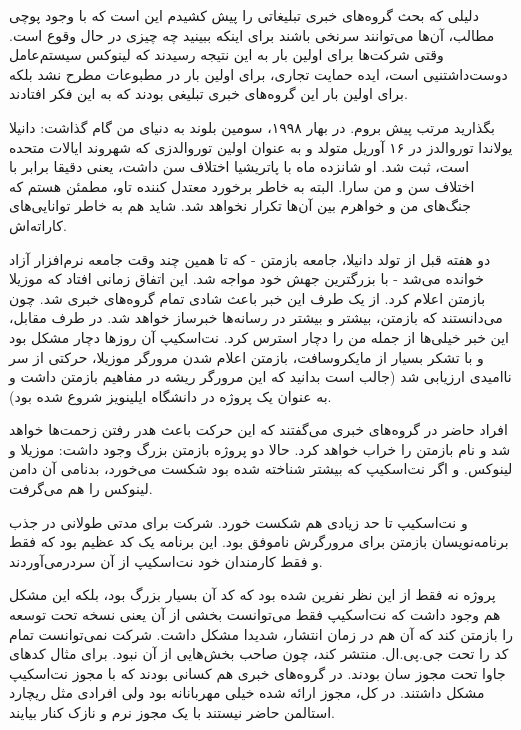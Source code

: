 دلیلی که بحث گروه‌های خبری تبلیغاتی را پیش کشیدم این است که با وجود
پوچی مطالب، آن‌ها می‌توانند سرنخی باشند برای اینکه ببینید چه چیزی در حال
وقوع است. وقتی شرکت‌ها برای اولین بار به این نتیجه رسیدند که لینوکس
سیستم‌عامل دوست‌داشتنیی است، ایده حمایت تجاری، برای اولین بار در مطبوعات
مطرح نشد بلکه برای اولین بار این گروه‌های خبری تبلیغی بودند که به این
فکر افتادند.

بگذارید مرتب پیش بروم. در بهار ۱۹۹۸، سومین بلوند به دنیای من گام
گذاشت: دانیلا یولاندا توروالدز در
۱۶ آوریل متولد و به عنوان اولین توروالدزی که شهروند ایالات متحده است،
ثبت شد. او شانزده ماه با پاتریشیا اختلاف سن داشت، یعنی دقیقا برابر با
اختلاف سن و من سارا. البته به خاطر برخورد معتدل کننده تاو، مطمئن هستم
که جنگ‌های من و خواهرم بین آن‌ها تکرار نخواهد شد.  شاید هم به خاطر
توانایی‌های کاراته‌اش.

دو هفته قبل از تولد دانیلا، جامعه بازمتن - که تا همین چند وقت جامعه
نرم‌افزار آزاد خوانده می‌شد - با بزرگترین جهش خود مواجه شد. این اتفاق
زمانی افتاد که موزیلا بازمتن اعلام کرد. از یک طرف
این خبر باعث شادی تمام گروه‌های خبری شد. چون می‌دانستند که بازمتن، بیشتر
و بیشتر در رسانه‌ها خبرساز خواهد شد. در طرف مقابل، این خبر خیلی‌ها از
جمله من را دچار استرس کرد. نت‌اسکیپ آن روزها دچار مشکل بود و با تشکر
بسیار از مایکروسافت، بازمتن اعلام شدن مرورگر موزیلا، حرکتی از سر
ناامیدی ارزیابی شد (جالب است بدانید که این مرورگر ریشه در مفاهیم بازمتن
داشت و به عنوان یک پروژه در دانشگاه ایلینویز شروع شده بود).

افراد حاضر در گروه‌های خبری می‌گفتند که این حرکت باعث هدر رفتن زحمت‌ها
خواهد شد و نام بازمتن را خراب خواهد کرد. حالا دو پروژه بازمتن بزرگ
وجود داشت: موزیلا و لینوکس. و اگر نت‌اسکیپ که بیشتر شناخته شده بود شکست
می‌خورد، بدنامی آن دامن لینوکس را هم می‌گرفت.

و نت‌اسکیپ تا حد زیادی هم شکست خورد. شرکت برای مدتی طولانی در جذب
برنامه‌نویسان بازمتن برای مرورگرش ناموفق بود. این برنامه یک کد عظیم بود
که فقط و فقط کارمندان خود نت‌اسکیپ از آن سردرمی‌آوردند.

پروژه نه فقط از این نظر نفرین شده بود که کد آن بسیار بزرگ بود، بلکه
این مشکل هم وجود داشت که نت‌اسکیپ فقط می‌توانست بخشی از آن یعنی نسخه تحت
توسعه را بازمتن کند که آن هم در زمان انتشار، شدیدا مشکل داشت. شرکت
نمی‌توانست تمام کد را تحت جی.پی.ال. منتشر کند، چون صاحب بخش‌هایی از آن
نبود. برای مثال کدهای جاوا تحت مجوز سان بودند. در گروه‌های خبری هم
کسانی بودند که با مجوز نت‌اسکیپ مشکل داشتند. در کل، مجوز ارائه شده خیلی
مهربانانه بود ولی افرادی مثل ریچارد استالمن حاضر نیستند با یک مجوز نرم
و نازک کنار بیایند.

